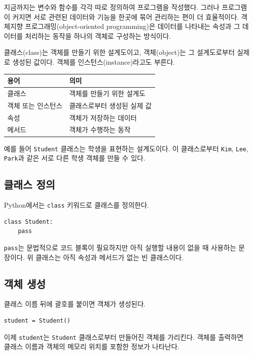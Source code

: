 \documentclass[11pt,a4paper]{article}
\begin{document}
지금까지는 변수와 함수를 각각 따로 정의하여 프로그램을 작성했다. 그러나 프로그램이 커지면 서로 관련된 데이터와 기능을 한곳에 묶어 관리하는 편이 더 효율적이다. 객체지향 프로그래밍(object-oriented programming)은 데이터를 나타내는 속성과 그 데이터를 처리하는 동작을 하나의 객체로 구성하는 방식이다.

클래스(class)는 객체를 만들기 위한 설계도이고, 객체(object)는 그 설계도로부터 실제로 생성된 값이다. 객체를 인스턴스(instance)라고도 부른다.

\begin{center}
\begin{tabular}{ll}
\toprule
용어 & 의미 \\
\midrule
클래스 & 객체를 만들기 위한 설계도 \\
객체 또는 인스턴스 & 클래스로부터 생성된 실제 값 \\
속성 & 객체가 저장하는 데이터 \\
메서드 & 객체가 수행하는 동작 \\
\bottomrule
\end{tabular}
\end{center}

예를 들어 \texttt{Student} 클래스는 학생을 표현하는 설계도이다. 이 클래스로부터 \texttt{Kim}, \texttt{Lee}, \texttt{Park}과 같은 서로 다른 학생 객체를 만들 수 있다.

\subsection{클래스 정의}

Python에서는 \texttt{class} 키워드로 클래스를 정의한다.

\begin{lstlisting}
class Student:
    pass
\end{lstlisting}

\texttt{pass}는 문법적으로 코드 블록이 필요하지만 아직 실행할 내용이 없을 때 사용하는 문장이다. 위 클래스는 아직 속성과 메서드가 없는 빈 클래스이다.

\subsection{객체 생성}

클래스 이름 뒤에 괄호를 붙이면 객체가 생성된다.

\begin{lstlisting}
student = Student()
\end{lstlisting}

이제 \texttt{student}는 \texttt{Student} 클래스로부터 만들어진 객체를 가리킨다. 객체를 출력하면 클래스 이름과 객체의 메모리 위치를 포함한 정보가 나타난다.
\end{document}
